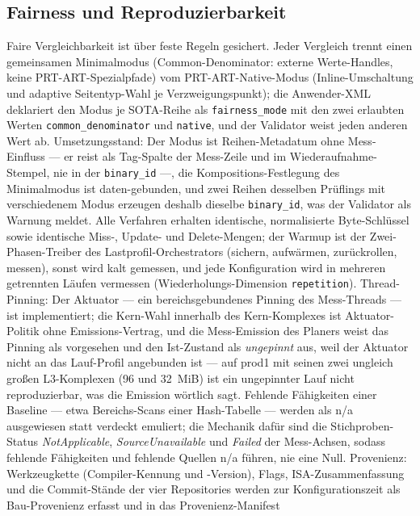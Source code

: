 \begin{nurlang}
\subsection{Fairness und Reproduzierbarkeit}\label{sec:fairness}
Faire Vergleichbarkeit ist über feste Regeln gesichert. Jeder Vergleich trennt einen gemeinsamen
Minimalmodus (Common-Denominator: externe Werte-Handles, keine PRT-ART-Spezialpfade) vom
PRT-ART-Native-Modus (Inline-Umschaltung und adaptive Seitentyp-Wahl je Verzweigungspunkt); die
Anwender-XML deklariert den Modus je SOTA-Reihe als \texttt{fairness\_mode} mit den zwei erlaubten
Werten \texttt{common\_denominator} und \texttt{native}, und der Validator weist jeden anderen Wert ab.
Umsetzungsstand: Der Modus ist Reihen-Metadatum ohne Mess-Einfluss --- er reist als Tag-Spalte der
Mess-Zeile und im Wiederaufnahme-Stempel, nie in der \texttt{binary\_id} ---, die Kompositions-Festlegung
des Minimalmodus ist daten-gebunden, und zwei Reihen desselben Prüflings mit verschiedenem Modus
erzeugen deshalb dieselbe \texttt{binary\_id}, was der Validator als Warnung meldet. Alle Verfahren
erhalten identische, normalisierte Byte-Schlüssel sowie identische Miss-, Update- und Delete-Mengen;
der Warmup ist der Zwei-Phasen-Treiber des Lastprofil-Orchestrators (sichern, aufwärmen,
zurückrollen, messen), sonst wird kalt gemessen, und jede Konfiguration wird in mehreren getrennten
Läufen vermessen (Wiederholungs-Dimension \texttt{repetition}). Thread-Pinning: Der Aktuator --- ein
bereichsgebundenes Pinning des Mess-Threads --- ist implementiert; die Kern-Wahl innerhalb des
Kern-Komplexes ist Aktuator-Politik ohne Emissions-Vertrag, und die Mess-Emission des Planers
weist das Pinning als vorgesehen und den Ist-Zustand als \emph{ungepinnt} aus, weil der
Aktuator nicht an das Lauf-Profil angebunden ist --- auf prod1 mit seinen zwei ungleich großen
L3-Komplexen (96 und 32~MiB) ist ein ungepinnter Lauf nicht reproduzierbar, was die Emission wörtlich
sagt. Fehlende Fähigkeiten einer Baseline --- etwa Bereichs-Scans einer Hash-Tabelle --- werden als
n/a ausgewiesen statt verdeckt emuliert; die Mechanik dafür sind die Stichproben-Status
\emph{NotApplicable}, \emph{SourceUnavailable} und \emph{Failed} der Mess-Achsen, sodass fehlende
Fähigkeiten und fehlende Quellen n/a führen, nie eine Null. Provenienz: Werkzeugkette
(Compiler-Kennung und -Version), Flags, ISA-Zusammenfassung und die Commit-Stände der vier
Repositories werden zur Konfigurationszeit als Bau-Provenienz erfasst und in das Provenienz-Manifest

\end{nurlang}
